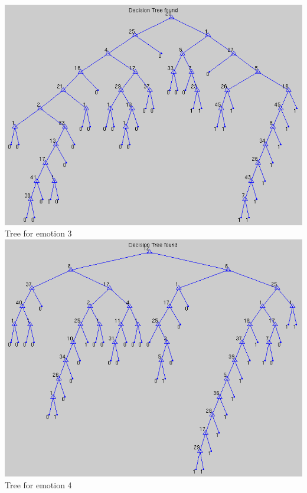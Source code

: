 \documentclass[12pt]{article}
\begin{document}
\begin{center}
  \includegraphics[scale=0.28]{report-images/tree3.png} \\
  Tree for emotion 3 \\
  \vspace{\baselineskip}
  \includegraphics[scale=0.28]{report-images/tree4.png} \\
  Tree for emotion 4 \\
  \vspace{\baselineskip}

\end{center}
\end{document}
